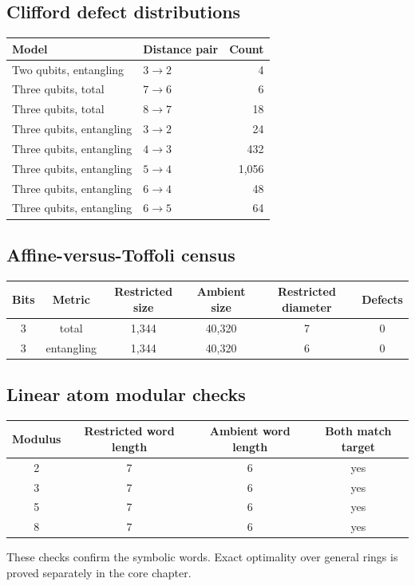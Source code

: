 \subsection{Clifford defect distributions}
\begin{longtable}{@{}p{}p{}r@{}}
\toprule
Model & Distance pair & Count\\
\midrule
Two qubits, entangling & $3\to2$ & 4\\
Three qubits, total & $7\to6$ & 6\\
Three qubits, total & $8\to7$ & 18\\
Three qubits, entangling & $3\to2$ & 24\\
Three qubits, entangling & $4\to3$ & 432\\
Three qubits, entangling & $5\to4$ & 1,056\\
Three qubits, entangling & $6\to4$ & 48\\
Three qubits, entangling & $6\to5$ & 64\\
\bottomrule
\end{longtable}

\subsection{Affine-versus-Toffoli census}
\begin{longtable}{@{}cccccc@{}}
\toprule
Bits & Metric & Restricted size & Ambient size & Restricted diameter & Defects\\
\midrule
3 & total & 1,344 & 40,320 & 7 & 0\\
3 & entangling & 1,344 & 40,320 & 6 & 0\\
\bottomrule
\end{longtable}

\subsection{Linear atom modular checks}
\begin{longtable}{@{}cccc@{}}
\toprule
Modulus & Restricted word length & Ambient word length & Both match target\\
\midrule
2 & 7 & 6 & yes\\
3 & 7 & 6 & yes\\
5 & 7 & 6 & yes\\
8 & 7 & 6 & yes\\
\bottomrule
\end{longtable}
These checks confirm the symbolic words.  Exact optimality over general rings is proved separately in the core chapter.

